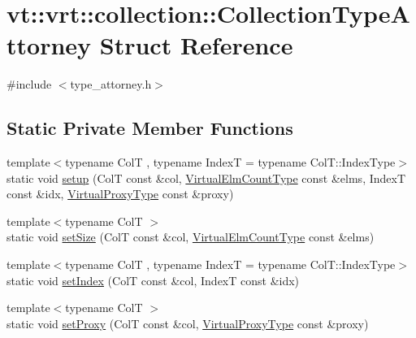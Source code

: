 \hypertarget{structvt_1_1vrt_1_1collection_1_1_collection_type_attorney}{}\section{vt\+:\+:vrt\+:\+:collection\+:\+:Collection\+Type\+Attorney Struct Reference}
\label{structvt_1_1vrt_1_1collection_1_1_collection_type_attorney}


{\ttfamily \#include $<$type\+\_\+attorney.\+h$>$}

\subsection*{Static Private Member Functions}
\begin{DoxyCompactItemize}
\item 
{\footnotesize template$<$typename ColT , typename IndexT  = typename Col\+T\+::\+Index\+Type$>$ }\\static void \hyperlink{structvt_1_1vrt_1_1collection_1_1_collection_type_attorney_aac58fe4b5ee46ddd4ac805b50cf96a16}{setup} (ColT const \&col, \hyperlink{namespacevt_ac115668758184050beff7a9281a2c490}{Virtual\+Elm\+Count\+Type} const \&elms, IndexT const \&idx, \hyperlink{namespacevt_a1b417dd5d684f045bb58a0ede70045ac}{Virtual\+Proxy\+Type} const \&proxy)
\item 
{\footnotesize template$<$typename ColT $>$ }\\static void \hyperlink{structvt_1_1vrt_1_1collection_1_1_collection_type_attorney_a7db6e5b003a44a90b291c77ae91de5f2}{set\+Size} (ColT const \&col, \hyperlink{namespacevt_ac115668758184050beff7a9281a2c490}{Virtual\+Elm\+Count\+Type} const \&elms)
\item 
{\footnotesize template$<$typename ColT , typename IndexT  = typename Col\+T\+::\+Index\+Type$>$ }\\static void \hyperlink{structvt_1_1vrt_1_1collection_1_1_collection_type_attorney_a871fe158dedc6747008cc501cfa076e5}{set\+Index} (ColT const \&col, IndexT const \&idx)
\item 
{\footnotesize template$<$typename ColT $>$ }\\static void \hyperlink{structvt_1_1vrt_1_1collection_1_1_collection_type_attorney_ab33159c686d52995eeb6898a1835fbbd}{set\+Proxy} (ColT const \&col, \hyperlink{namespacevt_a1b417dd5d684f045bb58a0ede70045ac}{Virtual\+Proxy\+Type} const \&proxy)
\end{DoxyCompactItemize}
